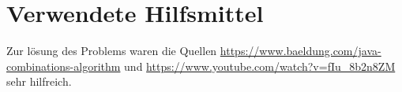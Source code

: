 \chapter{Verwendete Hilfsmittel}\label{ch:verwendete-hilfsmittel}

Zur lösung des Problems waren die Quellen \url{https://www.baeldung.com/java-combinations-algorithm}
und \url{https://www.youtube.com/watch?v=fIu_8b2n8ZM} sehr hilfreich.
